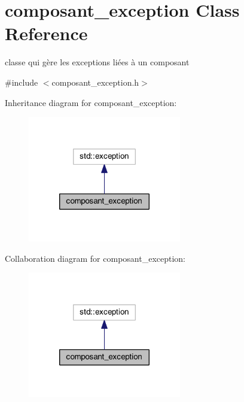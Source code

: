 \hypertarget{classcomposant__exception}{\section{composant\-\_\-exception Class Reference}
\label{classcomposant__exception}
}


classe qui gère les exceptions liées à un composant  




{\ttfamily \#include $<$composant\-\_\-exception.\-h$>$}



Inheritance diagram for composant\-\_\-exception\-:
\nopagebreak
\begin{figure}[H]
\begin{center}
\leavevmode
\includegraphics[width=190pt]{classcomposant__exception__inherit__graph}
\end{center}
\end{figure}


Collaboration diagram for composant\-\_\-exception\-:
\nopagebreak
\begin{figure}[H]
\begin{center}
\leavevmode
\includegraphics[width=190pt]{classcomposant__exception__coll__graph}
\end{center}
\end{figure}
